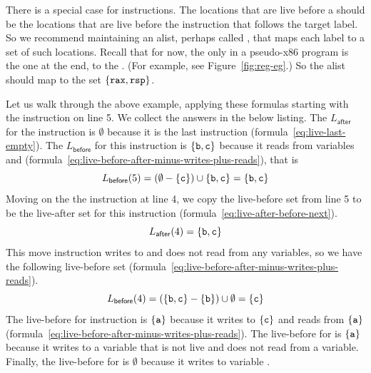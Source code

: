 \documentclass[11pt]{book}
\begin{document}
There is a special case for  instructions.  The locations
that are live before a  should be the locations that are
live before the instruction that follows the target label. So we
recommend maintaining an alist, perhaps called ,
that maps each label to a set of such locations. Recall that for now,
the only  in a pseudo-x86 program is the one at the end, to
the . (For example, see Figure~\ref{fig:reg-eg}.) So
the alist should map  to the set
$\{\mathtt{rax},\mathtt{rsp}\}$.

Let us walk through the above example, applying these formulas
starting with the instruction on line 5. We collect the answers in the
below listing.  The $L_{\mathsf{after}}$ for the 
instruction is $\emptyset$ because it is the last instruction
(formula~\ref{eq:live-last-empty}).  The $L_{\mathsf{before}}$ for
this instruction is $\{\mathtt{b},\mathtt{c}\}$ because it reads from
variables  and 
(formula~\ref{eq:live-before-after-minus-writes-plus-reads}), that is
\[
   L_{\mathsf{before}}(5) = (\emptyset - \{\mathtt{c}\}) \cup \{ \mathtt{b}, \mathtt{c} \} = \{ \mathtt{b}, \mathtt{c} \}
\]
Moving on the the instruction  at line 4, we copy
the live-before set from line 5 to be the live-after set for this
instruction (formula~\ref{eq:live-after-before-next}).
\[
  L_{\mathsf{after}}(4) = \{ \mathtt{b}, \mathtt{c} \}
\]
This move instruction writes to  and does not read from any
variables, so we have the following live-before set
(formula~\ref{eq:live-before-after-minus-writes-plus-reads}).
\[
  L_{\mathsf{before}}(4) = (\{\mathtt{b},\mathtt{c}\} - \{\mathtt{b}\}) \cup \emptyset = \{ \mathtt{c} \}
\]
The live-before for instruction 
is $\{\mathtt{a}\}$ because it writes to $\{\mathtt{c}\}$ and reads from $\{\mathtt{a}\}$
(formula~\ref{eq:live-before-after-minus-writes-plus-reads}).  The
live-before for  is $\{\mathtt{a}\}$ because it writes to a
variable that is not live and does not read from a variable.
Finally, the live-before for  is $\emptyset$
because it writes to variable .
\end{document}
